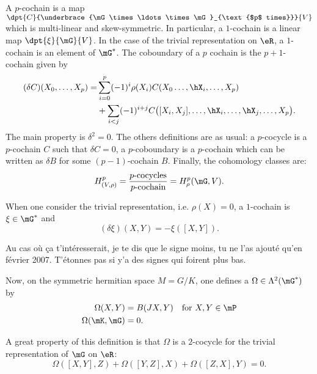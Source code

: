 A $p$-cochain is a map $\dpt{C}{\underbrace{\mG\times\ldots\times\mG}_{\text{$p$ times}}}{V}$ which is multi-linear and skew-symmetric. In particular, a $1$-cochain is a linear map $\dpt{\xi}{\mG}{V}$. In the case of the trivial representation on $\eR$, a $1$-cochain is an element of $\mG^*$. The coboundary of a $p$ cochain is the $p+1$-cochain given by
\begin{equation}
\begin{split}
(\delta C)(X_0,\ldots,X_p)=&\sum_{i=0}^{p}(-1)^i\rho(X_i)C(X_0\ldots,\hX_i,\ldots,X_p)\\
                           &+\sum_{i<j}(-1)^{i+j}C\big(  [X_i,X_j],\ldots,\hX_i,\ldots,\hX_j,\ldots,X_p \big).
\end{split}
\end{equation}
The main property is $\delta^2=0$. The others definitions are as usual: a $p$-cocycle is a $p$-cochain $C$ such that $\delta C=0$, a $p$-coboundary is a $p$-cochain which can be written as $\delta B$ for some  $(p-1)$-cochain $B$. Finally, the cohomology classes are:
\begin{equation}
H^{p}_{(V,\rho)}=\frac{\text{$p$-cocycles}}{\text{$p$-cochain}}=H^p_{\rho}(\mG,V).
\end{equation}

When one consider the trivial representation, i.e. $\rho(X)=0$, a $1$-cochain is $\xi\in\mG^*$ and
\begin{equation}  \label{EqDefcochaintrivC}
(\delta\xi)(X,Y)=-\xi([X,Y]).
\end{equation}

\begin{probleme}
Au cas où ça t'intéresserait, je te dis que le signe moins, tu ne l'as ajouté qu'en février 2007. T'étonnes pas si y'a des signes qui foirent plus bas.
\end{probleme}

Now, on the symmetric hermitian space $M=G/K$, one defines a $\Omega\in\Lambda^2(\mG^*)$ by
\begin{subequations}
\begin{align}
   \Omega(X,Y)&=B(JX,Y)&\text{for $X,Y\in\mP$}  \label{eq:def_Omega_1}    \\
   \Omega(\mK,\mG)&=0.                          \label{eq:def_Omega_2} 
\end{align}
\end{subequations}   

A great property of this definition is that $\Omega$ is a $2$-cocycle for the trivial representation of $\mG$ on $\eR$:
\[
\Omega([X,Y],Z)+\Omega([Y,Z],X)+\Omega([Z,X],Y)=0.
\]

